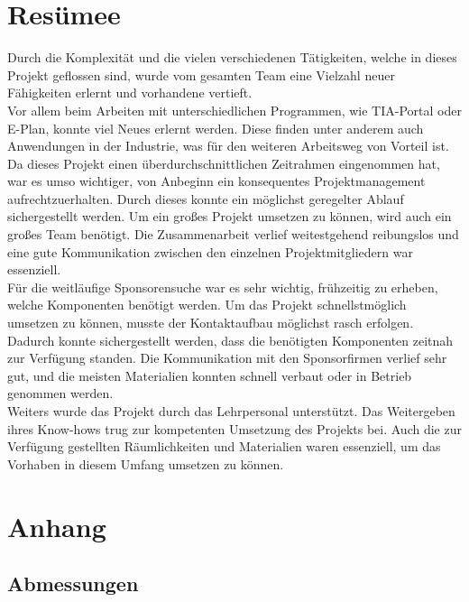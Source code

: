 
\section{Resümee}
Durch die Komplexität und die vielen verschiedenen Tätigkeiten, welche in dieses Projekt geflossen sind, wurde vom gesamten Team eine Vielzahl neuer Fähigkeiten erlernt und vorhandene vertieft.
\\

Vor allem beim Arbeiten mit unterschiedlichen Programmen, wie TIA-Portal oder E-Plan, konnte viel Neues erlernt werden. Diese finden unter anderem auch Anwendungen in der Industrie, was für den weiteren Arbeitsweg von Vorteil ist.
\\

Da dieses Projekt einen überdurchschnittlichen Zeitrahmen eingenommen hat, war es umso wichtiger, von Anbeginn ein konsequentes Projektmanagement aufrechtzuerhalten. Durch dieses konnte ein möglichst geregelter Ablauf sichergestellt werden. Um ein großes Projekt umsetzen zu können, wird auch ein großes Team benötigt. Die Zusammenarbeit verlief weitestgehend reibungslos und eine gute Kommunikation zwischen den einzelnen Projektmitgliedern war essenziell.
\\

Für die weitläufige Sponsorensuche war es sehr wichtig, frühzeitig zu erheben, welche Komponenten benötigt werden. Um das Projekt schnellstmöglich umsetzen zu können, musste der Kontaktaufbau möglichst rasch erfolgen. Dadurch konnte sichergestellt werden, dass die benötigten Komponenten zeitnah zur Verfügung standen. Die Kommunikation mit den Sponsorfirmen verlief sehr gut, und die meisten Materialien konnten schnell verbaut oder in Betrieb genommen werden.
\\

Weiters wurde das Projekt durch das Lehrpersonal unterstützt. Das Weitergeben ihres Know-hows trug zur kompetenten Umsetzung des Projekts bei. Auch die zur Verfügung gestellten Räumlichkeiten und Materialien waren essenziell, um das Vorhaben in diesem Umfang umsetzen zu können.


\section{Anhang}

\subsection{Abmessungen}


